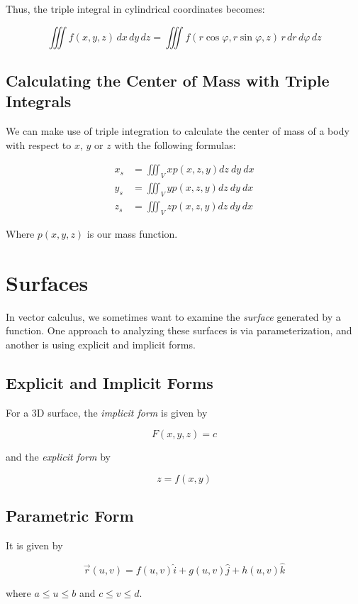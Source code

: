 Thus, the triple integral in cylindrical coordinates becomes:

\[
    \iiint f(x, y, z)\, dx\, dy\, dz = \iiint f(r \cos \varphi, r \sin \varphi, z)\, r\, dr\, d\varphi\, 
    dz
\]

\subsection{Calculating the Center of Mass with Triple Integrals}

We can make use of triple integration to calculate the center of mass of a body with
respect to \(x\), \(y\) or \(z\) with the following formulas:

\begin{align*}
    x_s &= \iiint_V xp(x,z,y)dz\ dy \ dx \\
    y_s &= \iiint_V yp(x,z,y)dz\ dy \ dx \\
    z_s &= \iiint_V zp(x,z,y)dz\ dy \ dx
\end{align*}

Where \(p(x,y,z)\) is our mass function.

\section{Surfaces}

In vector calculus, we sometimes want to examine the \emph{surface} generated by a function. One approach to analyzing these surfaces is via 
parameterization, and another is using explicit and implicit forms.

\subsection{Explicit and Implicit Forms}

For a 3D surface, the \emph{implicit form} is given by 

\[
    F(x,y,z) = c 
\]

and the \emph{explicit form} by 

\[
    z = f(x,y)
\]

\subsection{Parametric Form}

It is given by 

\[
    \vec{r}(u,v) = f(u,v)\hat{i} + g(u,v)\hat{j} + h(u,v)\hat{k}
\]

where \(a \le u \le b\) and \(c \le v \le d\).

